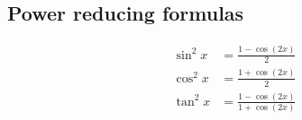 \subsection*{Power reducing formulas}

\begin{align*}
  \sin^2 x  &= \frac{1 - \cos(2x)}{2}\\
  \cos^2 x  &= \frac{1 + \cos(2x)}{2}\\
  \tan^2 x  &= \frac{1 - \cos(2x)}{1 + \cos(2x)}
\end{align*}